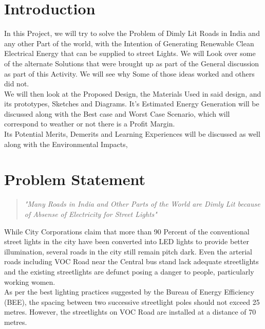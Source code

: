 \documentclass[11pt]{article}
\begin{document}
	
\tableofcontents
\thispagestyle{empty}
\clearpage


\setcounter{page}{1}

\section{Introduction}
In this Project, we will try to solve the Problem of Dimly Lit Roads in India and any other Part of the world, with the Intention of Generating Renewable Clean Electrical Energy that can be supplied to street Lights. We will Look over some of the alternate Solutions that were brought up as part of the General discussion as part of this Activity. We will see why Some of those ideas worked and others did not. \\

We will then look at the Proposed Design, the Materials Used in said design, and its prototypes, Sketches and Diagrams. It's Estimated Energy Generation will be discussed along with the Best case and Worst Case Scenario, which will correspond to weather or not there is a Profit Margin. \\

Its Potential Merits, Demerits and Learning Experiences will be discussed as well along with the Environmental Impacts, 

\section{Problem Statement}

\begin{quote}
	\textit{"Many Roads in India and Other Parts of the World are Dimly Lit because of Absense of Electricity for Street Lights"}
\end{quote}
While City Corporations claim that more than 90 Percent of the conventional street lights in the city have been converted into LED lights to provide better illumination, several roads in the city still remain pitch dark. Even the arterial roads including VOC Road near the Central bus stand lack adequate streetlights and the existing streetlights are defunct posing a danger to people, particularly working women.\\


As per the best lighting practices suggested by the Bureau of Energy Efficiency (BEE), the spacing between two successive streetlight poles should not exceed 25 metres. However, the streetlights on VOC Road are installed at a distance of 70 metres.\\
\end{document}
